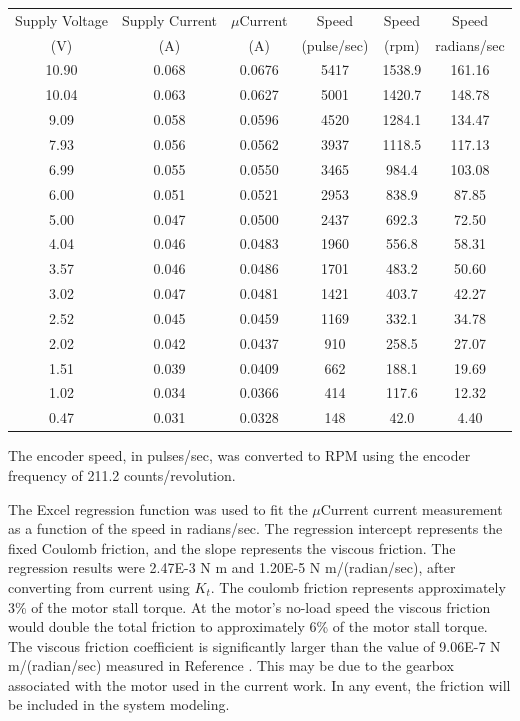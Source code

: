 \documentclass[12pt,letterpaper]{article}
\begin{document}
\begin{appendices}
\begin{tabular}{|c|c|c|c|c|c|}
Supply Voltage & Supply Current & $\mu$Current & Speed & Speed & Speed\\
(V) & (A) & (A) & (pulse/sec) & (rpm) & radians/sec\\
\hline
10.90 & 0.068 & 0.0676 & 5417 & 1538.9 & 161.16\\
10.04 & 0.063 & 0.0627 & 5001 & 1420.7 & 148.78\\
9.09 & 0.058 & 0.0596 & 4520 & 1284.1 & 134.47\\
7.93 & 0.056 & 0.0562 & 3937 & 1118.5 & 117.13\\
6.99 & 0.055 & 0.0550 & 3465 & 984.4 & 103.08\\
6.00 & 0.051 & 0.0521 & 2953 & 838.9 & 87.85\\
5.00 & 0.047 & 0.0500 & 2437 & 692.3 & 72.50\\
4.04 & 0.046 & 0.0483 & 1960 & 556.8 & 58.31\\
3.57 & 0.046 & 0.0486 & 1701 & 483.2 & 50.60\\
3.02 & 0.047 & 0.0481 & 1421 & 403.7 & 42.27\\
2.52 & 0.045 & 0.0459 & 1169 & 332.1 & 34.78\\
2.02 & 0.042 & 0.0437 & 910 & 258.5 & 27.07\\
1.51 & 0.039 & 0.0409 & 662 & 188.1 & 19.69\\
1.02 & 0.034 & 0.0366 & 414 & 117.6 & 12.32\\
0.47 & 0.031 & 0.0328 & 148 & 42.0 & 4.40\\
\end{tabular}

The encoder speed, in pulses/sec, was converted to RPM using the encoder frequency of 211.2
counts/revolution.

The Excel regression function was used to fit the $\mu$Current current measurement as a function
of the speed in radians/sec.  The regression intercept represents the fixed Coulomb friction, and the
slope represents the viscous friction.  The regression results were 2.47E-3 N m and 1.20E-5 N m/(radian/sec),
after converting from current using $K_{t}$.  The coulomb friction represents approximately 3\% of the 
motor stall torque.  At the motor's no-load speed the viscous friction would double the total friction to 
approximately 6\% of the motor stall torque.  The viscous friction coefficient is significantly larger than
the value of 9.06E-7 N m/(radian/sec) measured in Reference \cite{twoWheeled}.  This may be due to
the gearbox associated with the motor used in the current work.  In any event, the friction will be included
in the system modeling.



\end{appendices}
\end{document}
